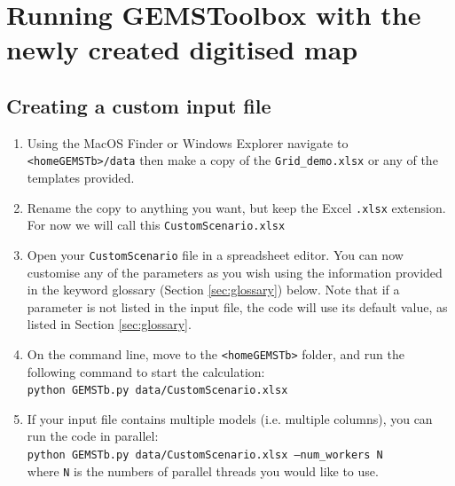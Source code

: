 \section{Running GEMSToolbox with the newly created digitised map}
\subsection{Creating a custom input file}
\begin{enumerate}
    \item Using the MacOS Finder or Windows Explorer navigate to {\tt <homeGEMSTb>/data} then make a copy of the {\tt Grid\_demo.xlsx} or any of the templates provided.
    \item Rename the copy to anything you want, but keep the Excel {\tt .xlsx} extension. For now we will call this {\tt CustomScenario.xlsx}
    \item Open your {\tt CustomScenario} file in a spreadsheet editor. You can now customise any of the parameters as you wish using the information provided in the keyword glossary (Section \ref{sec:glossary}) below. Note that if a parameter is not listed in the input file, the code will use its default value, as listed in Section \ref{sec:glossary}.
   \item On the command line, move to the {\tt <homeGEMSTb>} folder, and run the following command to start the calculation: \\
   {\tt python GEMSTb.py data/CustomScenario.xlsx}
   \item If your input file contains multiple models (i.e. multiple columns), you can run the code in parallel: \\
   {\tt python GEMSTb.py data/CustomScenario.xlsx --num\_workers N}\\ where {\tt N} is the numbers of parallel threads you would like to use.
\end{enumerate}


